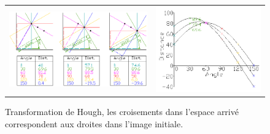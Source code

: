 \begin{figure}[ht!]
\centering
\begin{tabular}{cc}
\includegraphics[width = .5\columnwidth]{fig/Hough_transform_diagram.png} &
\includegraphics[width = .5\columnwidth]{fig/Hough_space_plot_example.png}
\end{tabular}
\caption{Transformation de Hough, les croisements dans l'espace arrivé correspondent aux droites dans l'image initiale. }
\label{fig102}
\end{figure}



